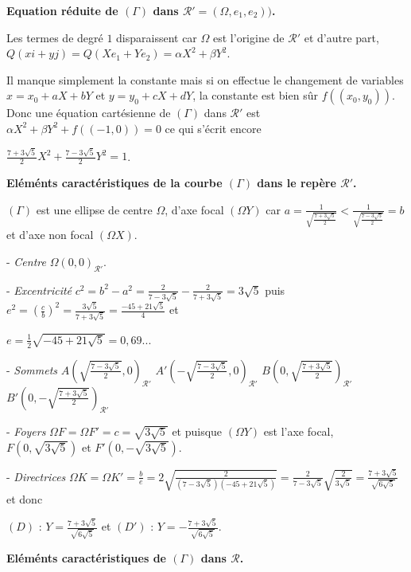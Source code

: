 {\begin{enumerate}
{\textbf{Equation réduite de $(\Gamma)$ dans $\mathcal{R}'=(\Omega,e_1,e_2))$.}

Les termes de degré $1$ disparaissent car $\Omega$ est l'origine de $\mathcal{R}'$ et d'autre part, $Q(xi+yj) = Q(Xe_1+Ye_2) =\alpha X^2+\beta Y^2$.

Il manque simplement la constante mais si on effectue le changement de variables $x = x_0+aX+bY$ et $y = y_0+cX+dY$, la constante est bien sûr $f((x_0,y_0))$. Donc une équation cartésienne de $(\Gamma)$ dans $\mathcal{R}'$ est $\alpha X^2+\beta Y^2+f((-1,0))= 0$ ce qui s'écrit encore

\begin{center}
$\frac{7+3\sqrt{5}}{2}X^2+\frac{7-3\sqrt{5}}{2}Y^2 = 1$.
\end{center}

\textbf{Eléménts caractéristiques de la courbe $(\Gamma)$ dans le repère $\mathcal{R}'$.}

$(\Gamma)$ est une ellipse de centre $\Omega$, d'axe focal $(\Omega Y)$ car $a=\frac{1}{\sqrt{\frac{7+3\sqrt{5}}{2}}}<\frac{1}{\sqrt{\frac{7-3\sqrt{5}}{2}}}=b$ et d'axe non focal $(\Omega X)$.

- \emph{Centre} $\Omega(0,0)_{\mathcal{R}'}$.
 
 
- \emph{Excentricité} $c^2=b^2-a^2 =\frac{2}{7-3\sqrt{5}}-\frac{2}{7+3\sqrt{5}}=3\sqrt{5}$ puis $e^2 =\left(\frac{c}{b}\right)^2=\frac{3\sqrt{5}}{7+3\sqrt{5}}=\frac{-45+21\sqrt{5}}{4}$ et 

$e=\frac{1}{2}\sqrt{-45+21\sqrt{5}}= 0,69...$
 
- \emph{Sommets} $A\left(\sqrt{\frac{7-3\sqrt{5}}{2}},0\right)_{\mathcal{R}'}$  $A'\left(-\sqrt{\frac{7-3\sqrt{5}}{2}},0\right)_{\mathcal{R}'}$  $B\left(0,\sqrt{\frac{7+3\sqrt{5}}{2}}\right)_{\mathcal{R}'}$  $B'\left(0,-\sqrt{\frac{7+3\sqrt{5}}{2}}\right)_{\mathcal{R}'}$ 

- \emph{Foyers} $\Omega F =\Omega F'=c=\sqrt{3\sqrt{5}}$  et puisque $(\Omega Y)$ est l'axe focal, $F(0,\sqrt{3\sqrt{5}})$ et $F'(0,-\sqrt{3\sqrt{5}})$. 

- \emph{Directrices} $\Omega K =\Omega K'=\frac{b}{e}=2\sqrt{\frac{2}{(7-3\sqrt{5})(-45+21\sqrt{5})}}=\frac{2}{7-3\sqrt{5}}\sqrt{\frac{2}{3\sqrt{5}}}=\frac{7+3\sqrt{5}}{\sqrt{6\sqrt{5}}}$ et donc 

$(D)$ : $Y =\frac{7+3\sqrt{5}}{\sqrt{6\sqrt{5}}}$ et $(D')$ : $Y = -\frac{7+3\sqrt{5}}{\sqrt{6\sqrt{5}}}$. 

\textbf{Eléménts caractéristiques de $(\Gamma)$ dans $\mathcal{R}$.}

}
\end{enumerate}}

